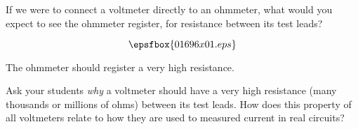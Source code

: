 

If we were to connect a voltmeter directly to an ohmmeter, what would you expect to see the ohmmeter register, for resistance between its test leads?

$$\epsfbox{01696x01.eps}$$







The ohmmeter should register a very high resistance.







Ask your students {\it why} a voltmeter should have a very high resistance (many thousands or millions of ohms) between its test leads.  How does this property of all voltmeters relate to how they are used to measured current in real circuits? 




